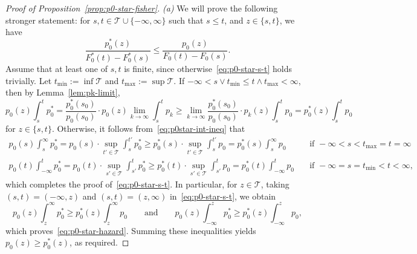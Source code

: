 \documentclass[a4paper]{article}
\theoremstyle{definition}
\begin{document}
\begin{proof}[Proof of Proposition~\ref{prop:p0-star-fisher}]
\textit{(a)} We will prove the following stronger statement: for $s,t \in \mathcal{T} \cup \{-\infty,\infty\}$ such that $s \leq t$, and $z \in \{s,t\}$, we have
\begin{equation}
\label{eq:p0-star-s-t}
\frac{p_0^*(z)}{F_0^*(t) - F_0^*(s)} \leq \frac{p_0(z)}{F_0(t) - F_0(s)}.
\end{equation}
Assume that at least one of $s,t$ is finite, since otherwise~\eqref{eq:p0-star-s-t} holds trivially. Let $t_{\min} := \inf\mathcal{T}$ and $t_{\max} := \sup\mathcal{T}$. If $-\infty < s \vee t_{\min} \leq t \wedge t_{\max} < \infty$, then by Lemma~\ref{lem:pk-limit},
\begin{equation}
\label{eq:p0star-int-ineq}
p_0(z) \int_s^t p_0^* = \frac{p_0^*(s_0)}{p_0(s_0)} \cdot p_0(z) \lim_{k \to \infty} \int_s^t p_k \geq \lim_{k \to \infty} \frac{p_0^*(s_0)}{p_0(s_0)} \cdot p_k(z) \int_s^t p_0 = p_0^*(z) \int_s^t p_0
\end{equation}
for $z \in \{s,t\}$. Otherwise, it follows from~\eqref{eq:p0star-int-ineq} that
\begin{align*}
\displaystyle p_0(s) \int_s^\infty p_0^* = p_0(s) \cdot \sup_{t' \in \mathcal{T}} \int_s^{t'} p_0^* \geq p_0^*(s) \cdot \sup_{t' \in \mathcal{T}} \int_s^{t'} p_0 = p_0^*(s) \int_s^\infty p_0 \quad&\text{if }-\infty < s < t_{\max} = t = \infty \\
\displaystyle p_0(t) \int_{-\infty}^t p_0^* = p_0(t) \cdot \sup_{s' \in \mathcal{T}} \int_{s'}^t p_0^* \geq p_0^*(t) \cdot \sup_{s' \in \mathcal{T}} \int_{s'}^t p_0 = p_0^*(t) \int_{-\infty}^t p_0 \quad&\text{if }-\infty = s = t_{\min} < t < \infty,
\end{align*}
which completes the proof of~\eqref{eq:p0-star-s-t}. In particular, for $z \in \mathcal{T}$, taking $(s,t) = (-\infty,z)$ and $(s,t) = (z,\infty)$ in~\eqref{eq:p0-star-s-t}, we obtain
\[
p_0(z) \int_z^\infty p_0^* \geq p_0^*(z) \int_z^\infty p_0 \qquad\text{and}\qquad p_0(z) \int_{-\infty}^z p_0^* \geq p_0^*(z) \int_{-\infty}^z p_0,
\]
which proves~\eqref{eq:p0-star-hazard}. Summing these inequalities yields $p_0(z) \geq p_0^*(z)$, as required.


\end{proof}
\end{document}
